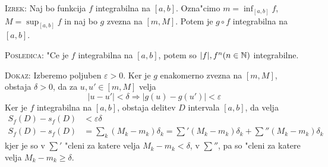 \textsc{Izrek:} Naj bo funkcija $f$ integrabilna na $[a, b]$. Ozna"cimo $m = \inf_{[a, b]} f$, $M = \sup_{[a, b]}f$ in naj bo $g$ zvezna na $[m, M]$. Potem je $g \circ f$ integrabilna na $[a, b]$.

\textsc{Posledica:} "Ce je $f$ integrabilna na $[a, b]$, potem so $|f|, f^n (n \in \mathbb{N})$ integrabilne.

\textsc{Dokaz:} Izberemo poljuben $\varepsilon > 0$. Ker je $g$ enakomerno zvezna na $[m, M]$, obstaja $\delta > 0$, da za $u, u' \in [m, M]$ velja
\begin{equation*}
|u - u'| < \delta \Rightarrow |g(u) - g(u')| < \varepsilon
\end{equation*}
Ker je $f$ integrabilna na $[a, b]$, obstaja delitev $D$ intervala $[a, b]$, da velja
\begin{align*}
S_f(D) - s_f(D) &< \varepsilon \delta \\
S_f(D) - s_f(D) &= \sum_k (M_k - m_k) \delta_k = \sum'(M_k - m_k) \delta_k + \sum''(M_k - m_k) \delta_k
\end{align*}
kjer je so v $\sum'$ "cleni za katere velja $M_k - m_k < \delta$, v $\sum''$, pa so "cleni za katere velja $M_k - m_k \geq \delta$.


